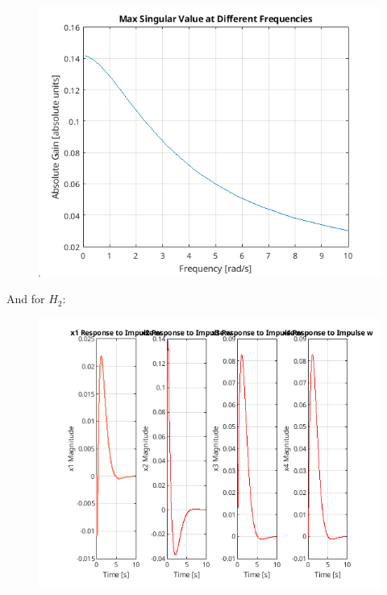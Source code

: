\documentclass[12pt, letterpaper]{article}
\begin{document}
\begin{figure}[H]
    \centering
    \includegraphics{sigmaHinf.png}
\end{figure}

And for $H_2$:

\begin{figure}[H]
    \centering
    \includegraphics{h2xResponseImpulse.png}
\end{figure}
\end{document}
